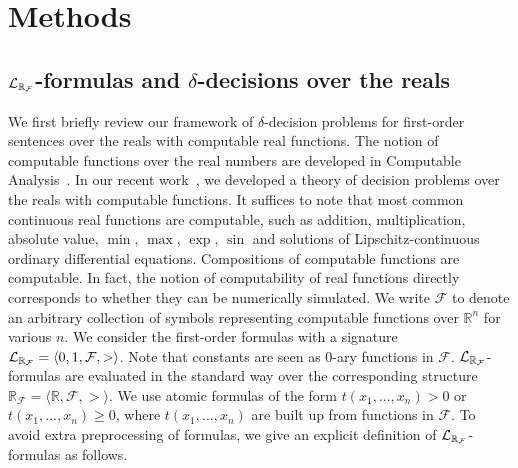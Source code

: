 \section{Methods}
\subsection{$\mathcal{L}_{\mathbb{R}_{\mathcal{F}}}$-formulas and $\delta$-decisions over the reals}

We first briefly review our framework of $\delta$-decision problems for first-order sentences over the reals with computable real functions.
%
The notion of computable functions over the real numbers are developed in Computable Analysis~\citep{CAbook}. In our recent work~\citep{gao12a,gao12b}, we developed a theory of decision problems over the reals with computable functions. %
It suffices to note that most common continuous real functions are computable, such as addition, multiplication, absolute value, $\min$, $\max$, $\exp$, $\sin$ and solutions of Lipschitz-continuous ordinary differential equations. Compositions of computable functions are computable. In fact, the notion of computability of real functions directly corresponds to whether they can be numerically simulated. We write $\mathcal{F}$ to denote an arbitrary collection of
symbols representing computable functions over $\mathbb{R}^n$ for various $n$. We consider the first-order formulas with a signature $\mathcal{L}_{\mathbb{R}_{\mathcal{F}}} = \langle 0,1,\mathcal{F},>\rangle$. Note that constants are seen as 0-ary functions in $\mathcal{F}$. $\mathcal{L}_{\mathbb{R}_{\mathcal{F}}}$-formulas are evaluated in the standard way over the corresponding structure $\mathbb{R}_{\mathcal{F}}= \langle \mathbb{R}, \mathcal{F}, >\rangle$.
We use atomic formulas of the form $t(x_1,...,x_n)>0$ or $t(x_1,...,x_n)\geq 0$, where $t(x_1,...,x_n)$ are built
up from functions in $\mathcal{F}$. To avoid extra preprocessing of formulas, we give an explicit definition of $\mathcal{L}_{\mathbb{R}_{\mathcal{F}}}$-formulas as follows.

